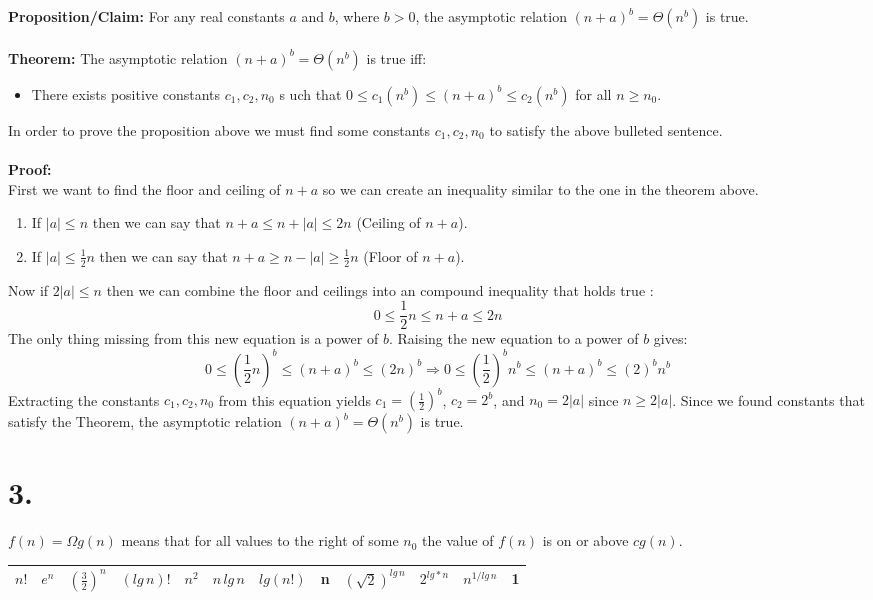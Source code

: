 \documentclass[12pt]{article}
\begin{document}
\subsection*{}
\textbf{Proposition/Claim: } For any real constants $a$ and $b$, where $b > 0$, the asymptotic relation $(n+a)^b = \Theta(n^b)$ is true.\\
\\
\textbf{Theorem: }The asymptotic relation $(n+a)^b = \Theta(n^b)$ is true iff:
\begin{itemize}
\item There exists positive constants $c_1, c_2, n_0$ s
uch that $0 \le c_1(n^b) \le (n+a)^b \le c_2(n^b)$ for all $n \ge n_0$.
\end{itemize}In order to prove the proposition above we must find some constants $c_1, c_2, n_0$ to satisfy the above bulleted sentence.\\
\\
\textbf{Proof: }\\
First we want to find the floor and ceiling of $n+a$ so we can create an inequality similar to the one in the theorem above.
\begin{enumerate}
\item If $|a| \le n$ then we can say that $n+a \le n+|a| \le 2n$ (Ceiling of $n+a$).
\item If $|a| \le \frac{1}{2}n$ then we can say that $n+a \ge n-|a| \ge \frac{1}{2}n$ (Floor of $n+a$). 
\end{enumerate}
Now if $2|a| \le n$ then we can combine the floor and ceilings into an compound inequality that holds true :
$$
0 \le \frac{1}{2}n \le n+a \le 2n
$$
The only thing missing from this new equation is a power of $b$.  Raising the new equation to a power of $b$ gives:
$$
0 \le (\frac{1}{2}n)^b \le (n+a)^b \le (2n)^b \Rightarrow 0 \le (\frac{1}{2})^bn^b \le (n+a)^b \le (2)^bn^b
$$  
Extracting the constants $c_1,c_2,n_0$ from this equation yields $c_1 = (\frac{1}{2})^b$, $c_2 = 2^b$, and $n_0 = 2|a|$ since $n \ge 2|a|$.  Since we found constants that satisfy the Theorem, the asymptotic relation $(n+a)^b = \Theta(n^b)$ is true.
\section*{3.}
$f(n) = \Omega{g(n)}$ means that for all values to the right of some $n_0$ the value of $f(n)$ is on or above $cg(n)$.\\
\begin{center}
\begin{tabular}{|c|c|c|c|c|c|c|c|c|c|c|c|}
\hline
$n!$&$e^n$&$(\frac{3}{2})^n$&$(lg\,n)!$&$n^2$&$n\,lg\,n$&$lg(n!)$&n&$(\sqrt{2})^{lg\,n}$&$2^{lg*n}$&$n^{1/lg\,n}$&1\\
\hline
\end{tabular}
\end{center}
\end{document}
